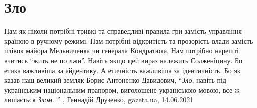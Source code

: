 
 
 
 
 
\chapter{Зло}

Нам як ніколи потрібні тривкі та справедливі правила гри замість управління
країною в ручному режимі. Нам потрібні відкритість та прозорість влади замість
плівок майора Мельниченка чи генерала Кондратюка. Нам потрібно нарешті вчитись
\enquote{жить не по лжи}. Навіть якщо цей вираз належить Солженіцину. Бо етика
важливіша за айдентику. А етичність важливіша за ідентичність. Бо як казав наш
великий земляк Борис Антоненко-Давидович, \enquote{\emph{Зло}, навіть під українським
національним прапором, виголошене українською мовою, все ж лишається \emph{Злом}...}
, 
Геннадій Друзенко, gazeta.ua, 14.06.2021

